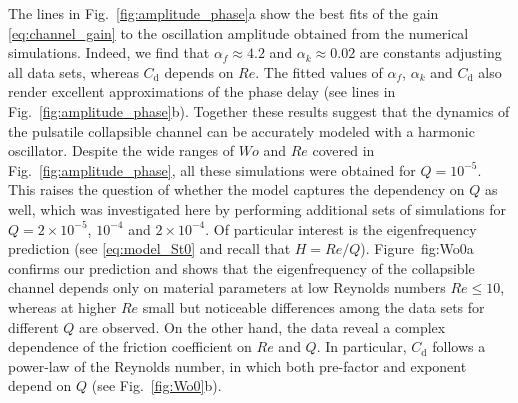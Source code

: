 \documentclass[aps,prl,reprint,superscriptaddress,floatfix]{revtex4-1}
\newcommand{\Rey}{\mathit{Re}}
\newcommand{\Wo}{\mathit{Wo}}
\begin{document}
The lines in Fig.~\ref{fig:amplitude_phase}a show the best fits of the gain \eqref{eq:channel_gain} to the oscillation amplitude obtained from the numerical simulations. Indeed, we find that $\alpha_f\approx4.2$ and $\alpha_k\approx0.02$ %
are constants adjusting all data sets, whereas $C_\text{d}$ depends on $\Rey$. The fitted values of $\alpha_f$, $\alpha_k$ and $C_\text{d}$ also render excellent approximations of the phase delay (see lines in Fig.~\ref{fig:amplitude_phase}b). Together these results suggest that the dynamics of the pulsatile collapsible channel can be accurately modeled with a harmonic oscillator. Despite the wide ranges of $\Wo$ and $\Rey$ covered in Fig.~\ref{fig:amplitude_phase}, all these simulations were obtained for $Q=10^{-5}$. This raises the question of whether the model captures the dependency on $Q$ as well, which was investigated here by performing additional sets of simulations for $Q=2\times 10^{-5}$, $10^{-4}$ and  $2\times 10^{-4}$.  Of particular interest is the eigenfrequency prediction (see \ref{eq:model_St0} and recall that $H=Re/Q$). Figure~{fig:Wo0}a confirms our prediction and shows that the eigenfrequency of the collapsible channel depends only on material parameters at low Reynolds numbers $\Rey\le 10$, whereas at higher $\Rey$ small but noticeable differences among the data sets for different $Q$ are observed. On the other hand, the data reveal a complex dependence of the friction coefficient on $\Rey$ and $Q$. In particular, $C_\text{d}$ follows a power-law of the Reynolds number, in which both pre-factor and exponent depend on $Q$ (see Fig.~\ref{fig:Wo0}b). 
\end{document}
